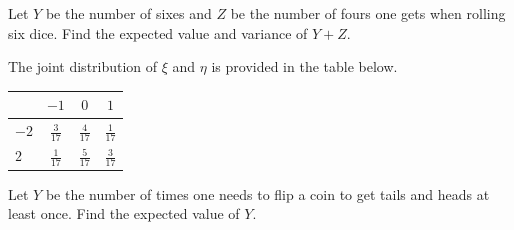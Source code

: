 \documentclass[14pt]{exam}
\begin{document}
\begin{questions}
		
		\question
		Let $Y$ be the number of sixes and $Z$ be the number of fours one gets when rolling six dice. Find the expected value and variance of $Y + Z$.
		




		
		\question
		The joint distribution of $\xi$ and $\eta$ is provided in the table below.
		
		\begin{tabular}{|l|ccc|}
			\hline
			\diagbox{$\eta$}{$\xi$} & $-1$ & $0$ & $1$\\\hline
			$-2$ & $\frac{3}{17}$ & $\frac{4}{17}$ & $\frac{1}{17}$\\
			$2$ & $\frac{1}{17}$ & $\frac{5}{17}$ & $\frac{3}{17}$\\\hline
		\end{tabular}
		




			
			\question
			Let $Y$ be the number of times one needs to flip a coin to get tails and heads at least once. Find the expected value of $Y$.
			




 	\end{questions}
 	
 	
 	\pagebreak
\end{document}
